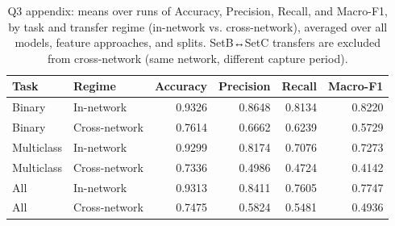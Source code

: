 \begin{table}
\caption{Q3 appendix: means over runs of Accuracy, Precision, Recall, and Macro-F1, by task and transfer regime (in-network vs. cross-network), averaged over all models, feature approaches, and splits. SetB↔SetC transfers are excluded from cross-network (same network, different capture period).}
\label{tab:q3_appendix_overall}
\begin{tabular}{llrrrr}
\toprule
Task & Regime & Accuracy & Precision & Recall & Macro-F1 \\
\midrule
Binary & In-network & 0.9326 & 0.8648 & 0.8134 & 0.8220 \\
Binary & Cross-network & 0.7614 & 0.6662 & 0.6239 & 0.5729 \\
Multiclass & In-network & 0.9299 & 0.8174 & 0.7076 & 0.7273 \\
Multiclass & Cross-network & 0.7336 & 0.4986 & 0.4724 & 0.4142 \\
All & In-network & 0.9313 & 0.8411 & 0.7605 & 0.7747 \\
All & Cross-network & 0.7475 & 0.5824 & 0.5481 & 0.4936 \\
\bottomrule
\end{tabular}
\end{table}
